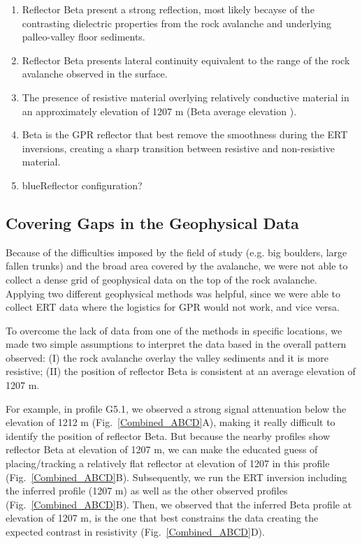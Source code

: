 \documentclass[utf8]{frontiersSCNS}
\newcommand{\COMON}{\begin{color}{blue}}
\newcommand{\COMOFF}{\end{color}}
\begin{document}
\begin{enumerate}[I]
\item Reflector Beta present a strong reflection, most likely becayse of the contrasting dielectric properties from the rock avalanche and underlying palleo-valley floor sediments. 
\item Reflector Beta presents lateral continuity equivalent to the range of the rock avalanche observed in the surface.  
\item The presence of resistive material overlying relatively conductive material in an approximately elevation of 1207 m (Beta average elevation ). 
\item Beta is the GPR reflector that best remove the smoothness during the ERT inversions, creating a sharp transition between resistive and non-resistive material.
\item  \COMON Reflector configuration? \COMOFF 
\end{enumerate}



\subsection{Covering Gaps in the Geophysical Data}

Because of the difficulties imposed by the field of study (e.g. big boulders,  large fallen trunks) and the broad area covered by the avalanche, we were not able to collect a dense grid of geophysical data on the top of the rock avalanche. Applying two different geophysical methods was helpful, since we were able to collect ERT data where the logistics for GPR would not work, and vice versa. 

To overcome the lack of data from one of the methods in specific locations, we made two simple assumptions to interpret the data based in the overall pattern observed: (I) the rock avalanche overlay the valley sediments and it is more resistive; (II) the position of reflector Beta is consistent at an average elevation of 1207 m.  

For example, in profile G5.1, we observed a strong signal attenuation below the elevation of 1212 m (Fig.~\ref{Combined_ABCD}A), making it really difficult to identify the position of reflector Beta. But because the nearby profiles show reflector Beta at elevation of 1207 m, we can make the educated guess of placing/tracking a relatively flat reflector at elevation of 1207 in this profile (Fig.~\ref{Combined_ABCD}B). Subsequently, we run the ERT inversion including the inferred profile (1207 m) as well as the other observed profiles (Fig.~\ref{Combined_ABCD}B). Then, we observed that the inferred Beta profile at elevation of 1207 m, is the one that best constrains the data creating the expected contrast in resistivity (Fig.~\ref{Combined_ABCD}D).  
\end{document}
